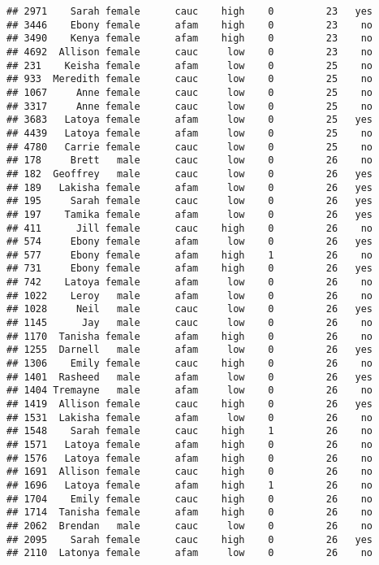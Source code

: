 \documentclass[
]{article}
\begin{document}
\begin{verbatim}
## 2971    Sarah female      cauc    high    0         23   yes
## 3446    Ebony female      afam    high    0         23    no
## 3490    Kenya female      afam    high    0         23    no
## 4692  Allison female      cauc     low    0         23    no
## 231    Keisha female      afam     low    0         25    no
## 933  Meredith female      cauc     low    0         25    no
## 1067     Anne female      cauc     low    0         25    no
## 3317     Anne female      cauc     low    0         25    no
## 3683   Latoya female      afam     low    0         25   yes
## 4439   Latoya female      afam     low    0         25    no
## 4780   Carrie female      cauc     low    0         25    no
## 178     Brett   male      cauc     low    0         26    no
## 182  Geoffrey   male      cauc     low    0         26   yes
## 189   Lakisha female      afam     low    0         26   yes
## 195     Sarah female      cauc     low    0         26   yes
## 197    Tamika female      afam     low    0         26   yes
## 411      Jill female      cauc    high    0         26    no
## 574     Ebony female      afam     low    0         26   yes
## 577     Ebony female      afam    high    1         26    no
## 731     Ebony female      afam    high    0         26   yes
## 742    Latoya female      afam     low    0         26    no
## 1022    Leroy   male      afam     low    0         26    no
## 1028     Neil   male      cauc     low    0         26   yes
## 1145      Jay   male      cauc     low    0         26    no
## 1170  Tanisha female      afam    high    0         26    no
## 1255  Darnell   male      afam     low    0         26   yes
## 1306    Emily female      cauc    high    0         26    no
## 1401  Rasheed   male      afam     low    0         26   yes
## 1404 Tremayne   male      afam     low    0         26    no
## 1419  Allison female      cauc    high    0         26   yes
## 1531  Lakisha female      afam     low    0         26    no
## 1548    Sarah female      cauc    high    1         26    no
## 1571   Latoya female      afam    high    0         26    no
## 1576   Latoya female      afam    high    0         26    no
## 1691  Allison female      cauc    high    0         26    no
## 1696   Latoya female      afam    high    1         26    no
## 1704    Emily female      cauc    high    0         26    no
## 1714  Tanisha female      afam    high    0         26    no
## 2062  Brendan   male      cauc     low    0         26    no
## 2095    Sarah female      cauc    high    0         26   yes
## 2110  Latonya female      afam     low    0         26    no

\end{verbatim}
\end{document}
